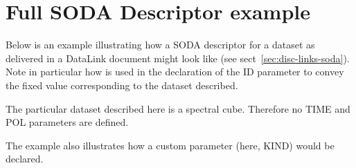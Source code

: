 \documentclass[11pt,a4paper]{ivoa}
\begin{document}
\appendix

\section{Full SODA Descriptor example}
\label{app:fullsoda}

Below is an example illustrating how a SODA descriptor for a dataset as
delivered in a DataLink document might look like (see
sect~\ref{sec:disc-links-soda}).  Note in particular how 
is used in the declaration of the ID parameter to convey the fixed value
corresponding to the dataset described.

The particular dataset described here is a spectral cube.  Therefore
no TIME and POL parameters are defined.

The example also illustrates how a custom parameter (here, KIND) would
be declared.
\end{document}
